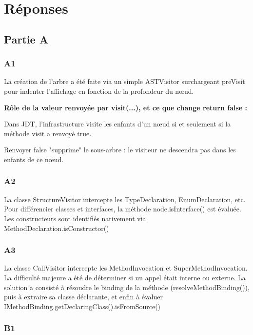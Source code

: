 \documentclass{Templates/customArticle}
\begin{document}
\section{Réponses}

\subsection{Partie A}

\subsubsection{A1}

La création de l'arbre a été faite via un simple ASTVisitor surchargeant preVisit pour indenter l'affichage en fonction de la profondeur du nœud.

\noindent
\textbf{Rôle de la valeur renvoyée par visit(...), et ce que change return false :}

Dans JDT, l'infrastructure visite les enfants d'un nœud si et seulement si la méthode visit a renvoyé true.

Renvoyer false "supprime" le sous-arbre : le visiteur ne descendra pas dans les enfants de ce nœud.

\subsubsection{A2}

La classe StructureVisitor intercepte les TypeDeclaration, EnumDeclaration, etc. 
Pour différencier classes et interfaces, la méthode node.isInterface() est évaluée. 
Les constructeurs sont identifiés nativement via MethodDeclaration.isConstructor()

\subsubsection{A3}

La classe CallVisitor intercepte les MethodInvocation et SuperMethodInvocation.
La difficulté majeure a été de déterminer si un appel était interne ou externe.
La solution a consisté à résoudre le binding de la méthode (resolveMethodBinding()), puis à extraire sa classe déclarante, et enfin à évaluer IMethodBinding.getDeclaringClass().isFromSource()

\subsubsection{B1}
\end{document}
